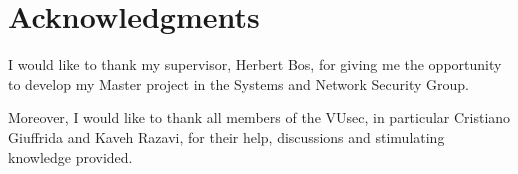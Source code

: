 
\bigskip

\begingroup
\let\clearpage\relax
\let\cleardoublepage\relax
\let\cleardoublepage\relax
\chapter*{Acknowledgments}
I would like to thank my supervisor, Herbert Bos, for giving me the opportunity
to develop my Master project in the Systems and Network Security Group.

Moreover, I would like to thank all members of the VUsec, in particular
Cristiano Giuffrida and Kaveh Razavi, for their help, discussions and
stimulating knowledge provided.
\endgroup
